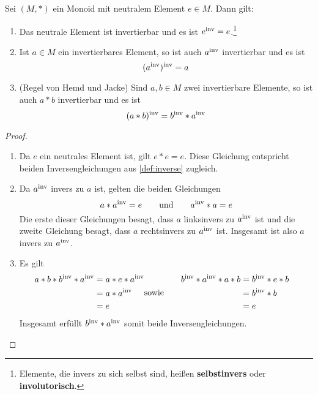 \begin{satz} \label{regelnfuerinv} 
    Sei $(M,*)$ ein Monoid mit neutralem Element $e\in M$. Dann gilt:
    \begin{enumerate}
        \item Das neutrale Element ist invertierbar und es ist $e^{\mathrm{inv}} = e$.\footnote{Elemente, die invers zu sich selbst sind, heißen \textbf{selbstinvers} oder \textbf{involutorisch}.}
        \item Ist $a\in M$ ein invertierbares Element, so ist auch $a^{\mathrm{inv}}$ invertierbar und es ist
            \[(a^{\mathrm{inv}})^{\mathrm{inv}} = a \]
        \item(Regel von Hemd und Jacke) Sind $a,b\in M$ zwei invertierbare Elemente, so ist auch $a*b$ invertierbar und es ist
            \[ (a*b)^{\mathrm{inv}} = b^{\mathrm{inv}} * a^{\mathrm{inv}} \]
    \end{enumerate}
\end{satz}
\begin{proof}
    \begin{enumerate}
        \item Da $e$ ein neutrales Element ist, gilt $e*e=e$. Diese Gleichung entspricht beiden Inversengleichungen aus \cref{def:inverse} zugleich.
        \item Da $a^{\mathrm{inv}}$ invers zu $a$ ist, gelten die beiden Gleichungen
            \[ a*a^{\mathrm{inv}} = e \qquad\text{und}\qquad a^{\mathrm{inv}} * a=e \]
        Die erste dieser Gleichungen besagt, dass $a$ linksinvers zu $a^{\mathrm{inv}}$ ist und die zweite Gleichung besagt, dass $a$ rechtsinvers zu $a^{\mathrm{inv}}$ ist. Insgesamt ist also $a$ invers zu $a^{\mathrm{inv}}$.
        \item Es gilt
        \begin{align*}
            \begin{split}
                a*b* b^{\mathrm{inv}} *a^{\mathrm{inv}}  & =  a*e*a^{\mathrm{inv}} \\
                & = a*a^{\mathrm{inv}} \\
                & = e
            \end{split} & \text{sowie}\qquad \begin{split}
                b^{\mathrm{inv}} *a^{\mathrm{inv}} * a*b  & =  b^{\mathrm{inv}} * e* b \\
                & = b^{\mathrm{inv}} * b \\
                & = e
            \end{split}
        \end{align*}
        Insgesamt erfüllt $b^{\mathrm{inv}} *a^{\mathrm{inv}}$ somit beide Inversengleichungen. \qedhere
    \end{enumerate}
\end{proof}


